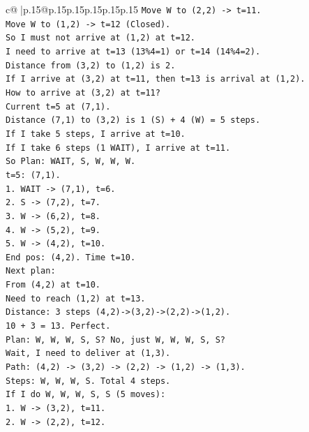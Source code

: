 \documentclass{article}
\begin{document}
{\begin{supertabular}{c@{$\;$}|p{.15\linewidth}@{}p{.15\linewidth}p{.15\linewidth}p{.15\linewidth}p{.15\linewidth}p{.15\linewidth}}
{{{\texttt{Move W to (2,2) {-}> t=11.} \\
\texttt{Move W to (1,2) {-}> t=12 (Closed).} \\
\texttt{So I must not arrive at (1,2) at t=12.} \\
\texttt{I need to arrive at t=13 (13\%4=1) or t=14 (14\%4=2).} \\
\texttt{Distance from (3,2) to (1,2) is 2.} \\
\texttt{If I arrive at (3,2) at t=11, then t=13 is arrival at (1,2).} \\
\texttt{How to arrive at (3,2) at t=11?} \\
\texttt{Current t=5 at (7,1).} \\
\texttt{Distance (7,1) to (3,2) is 1 (S) + 4 (W) = 5 steps.} \\
\texttt{If I take 5 steps, I arrive at t=10.} \\
\texttt{If I take 6 steps (1 WAIT), I arrive at t=11.} \\
\texttt{So Plan: WAIT, S, W, W, W.} \\
\texttt{t=5: (7,1).} \\
\texttt{1. WAIT {-}> (7,1), t=6.} \\
\texttt{2. S {-}> (7,2), t=7.} \\
\texttt{3. W {-}> (6,2), t=8.} \\
\texttt{4. W {-}> (5,2), t=9.} \\
\texttt{5. W {-}> (4,2), t=10.} \\
\texttt{End pos: (4,2). Time t=10.} \\
\texttt{Next plan:} \\
\texttt{From (4,2) at t=10.} \\
\texttt{Need to reach (1,2) at t=13.} \\
\texttt{Distance: 3 steps (4,2){-}>(3,2){-}>(2,2){-}>(1,2).} \\
\texttt{10 + 3 = 13. Perfect.} \\
\texttt{Plan: W, W, W, S, S? No, just W, W, W, S, S?} \\
\texttt{Wait, I need to deliver at (1,3).} \\
\texttt{Path: (4,2) {-}> (3,2) {-}> (2,2) {-}> (1,2) {-}> (1,3).} \\
\texttt{Steps: W, W, W, S. Total 4 steps.} \\
\texttt{If I do W, W, W, S, S (5 moves):} \\
\texttt{1. W {-}> (3,2), t=11.} \\
\texttt{2. W {-}> (2,2), t=12.} \\
}}}
\end{supertabular}}
\end{document}
